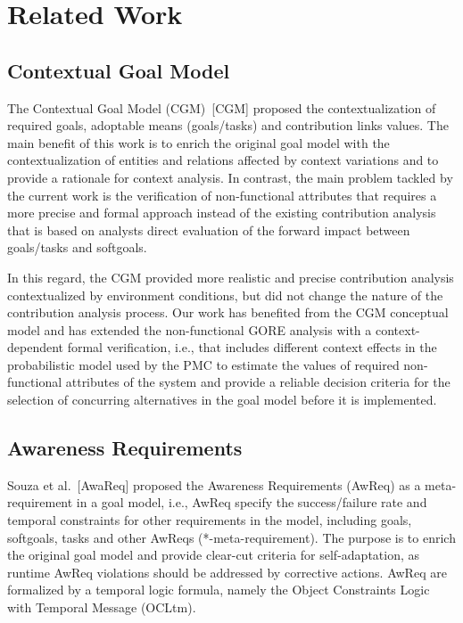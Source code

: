 \chapter{Related Work}\label{ch_related_work}

\section{Contextual Goal Model}

The Contextual Goal Model (CGM)~[CGM] proposed the contextualization of required goals, adoptable means (goals/tasks) and contribution links values. The main benefit of this work is to enrich the original goal model with the contextualization of entities and relations affected by context variations and to provide a rationale for context analysis. In contrast, the main problem tackled by the current work is the verification of non-functional attributes that requires a more precise and formal approach instead of the existing contribution analysis that is based on analysts direct evaluation of the forward impact between goals/tasks and softgoals. 

In this regard, the CGM provided more realistic and precise contribution analysis contextualized by environment conditions, but did not change the nature of the contribution analysis process. Our work has benefited from the CGM conceptual model and has extended the non-functional GORE analysis with a context-dependent formal verification, i.e., that includes different context effects in the probabilistic model used by the PMC to estimate the values of required non-functional attributes of the system and provide a reliable decision criteria for the selection of concurring alternatives in the goal model before it is implemented.

\section{Awareness Requirements}

Souza et al.~[AwaReq] proposed the Awareness Requirements (AwReq) as a meta-requirement in a goal model, i.e., AwReq specify the success/failure rate and temporal constraints for other requirements in the model, including goals, softgoals, tasks and other AwReqs (*-meta-requirement). The purpose is to enrich the original goal model and provide clear-cut criteria for self-adaptation, as runtime AwReq violations should be addressed by corrective actions. AwReq are formalized by a temporal logic formula, namely the Object Constraints Logic with Temporal Message (OCLtm).

